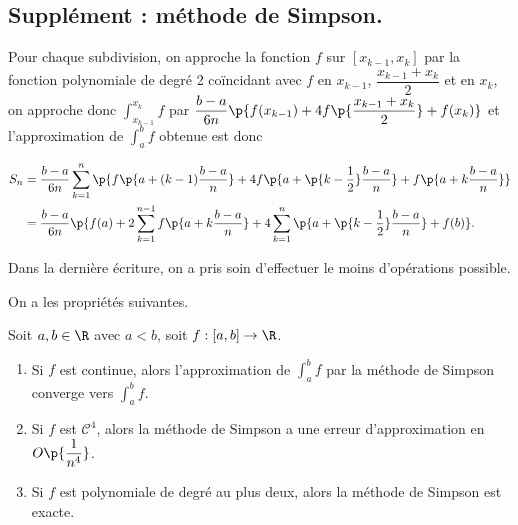 \subsection{Supplément : méthode de Simpson.}

Pour chaque subdivision, on approche la fonction $f$ sur $[x_{k-1},x_{k}]$ par la fonction polynomiale de degré 2 coïncidant avec $f$ en $x_{k-1}$, $\dfrac{x_{k-1} + x_k}{2}$ et en $x_k$, on approche donc $\displaystyle\int_{x_{k-1}}^{x_{k}} f$ par $\dfrac{b-a}{6n}\p{f(x_{k-1}) + 4 f\p{\dfrac{x_{k-1} + x_k}{2}}+ f(x_k)}$ et l'approximation de  $\displaystyle\int_a^b f$ obtenue est donc 

\begin{align*}
  S_n &= \dfrac{b-a}{6n} \sum_{k=1}^n \p{f\p{a+(k-1)\dfrac{b-a}{n}}+ 4f\p{a+\p{k-\dfrac{1}{2}}\dfrac{b-a}{n}} + f\p{a+k\dfrac{b-a}{n}}} \\
      &= \dfrac{b-a}{6n} \p{ f(a) + 2 \sum_{k=1}^{n-1}  f\p{a+k\dfrac{b-a}{n}} + 4 \sum_{k=1}^{n}  \p{a+\p{k-\dfrac{1}{2}}\dfrac{b-a}{n}}+  f(b)}.
\end{align*}

\begin{rem}
  Dans la dernière écriture, on a pris soin d'effectuer le moins d'opérations possible. 
\end{rem}

On a les propriétés suivantes. 

\begin{prop}
  Soit $a,b \in \R$ avec $a<b$, soit $f : [a,b] \to \R$. 
  \begin{enumerate}
    \item Si $f$ est continue, alors l'approximation de $\displaystyle\int_a^b f$ par la méthode de Simpson converge vers $\displaystyle\int_a^b f$. 
    \item Si $f$ est $\mathscr{C}^4$, alors la méthode de Simpson a une erreur d'approximation en $O\p{\dfrac{1}{n^4}}$. 
    \item Si $f$ est polynomiale de degré au plus deux, alors la méthode de Simpson est exacte. 
  \end{enumerate}
\end{prop}


